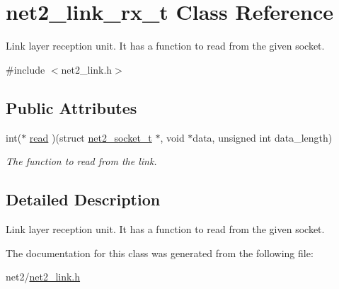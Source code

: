 \hypertarget{structnet2__link__rx__t}{\section{net2\-\_\-link\-\_\-rx\-\_\-t Class Reference}
\label{structnet2__link__rx__t}
}


Link layer reception unit. It has a function to read from the given socket.  




{\ttfamily \#include $<$net2\-\_\-link.\-h$>$}

\subsection*{Public Attributes}
\begin{DoxyCompactItemize}
\item 
\hypertarget{structnet2__link__rx__t_a4cf71287a067a11d18e3e8deb7fd5f9d}{int($\ast$ \hyperlink{structnet2__link__rx__t_a4cf71287a067a11d18e3e8deb7fd5f9d}{read} )(struct \hyperlink{structnet2__socket__t}{net2\-\_\-socket\-\_\-t} $\ast$, void $\ast$data, unsigned int data\-\_\-length)}\label{structnet2__link__rx__t_a4cf71287a067a11d18e3e8deb7fd5f9d}

\begin{DoxyCompactList}\small\item\em The function to read from the link. \end{DoxyCompactList}\end{DoxyCompactItemize}


\subsection{Detailed Description}
Link layer reception unit. It has a function to read from the given socket. 

The documentation for this class was generated from the following file\-:\begin{DoxyCompactItemize}
\item 
net2/\hyperlink{net2__link_8h}{net2\-\_\-link.\-h}\end{DoxyCompactItemize}
